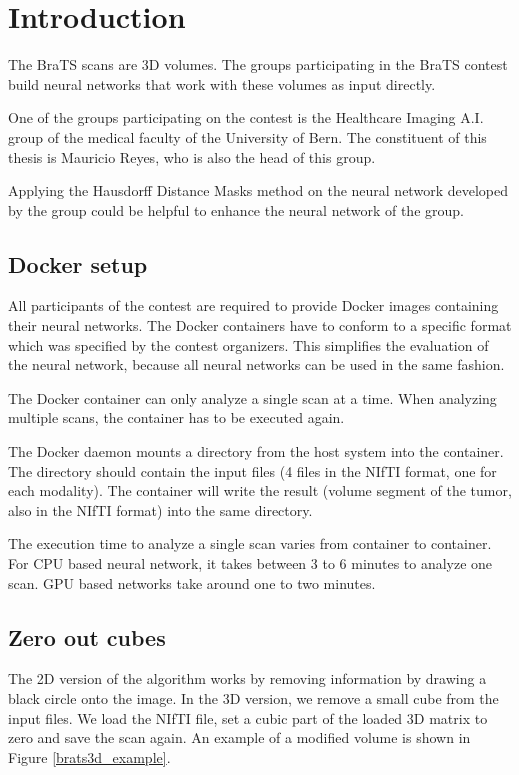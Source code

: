 \section{Introduction}
The BraTS scans are 3D volumes. The groups participating in the BraTS contest build neural networks that work with these volumes as input directly.

One of the groups participating on the contest is the Healthcare Imaging A.I. group of the medical faculty of the University of Bern. The constituent of this thesis
is Mauricio Reyes, who is also the head of this group.

Applying the Hausdorff Distance Masks method on the neural network developed by the group could be helpful to enhance the neural network of the group.

\subsection{Docker setup}

All participants of the contest are required to provide Docker images containing their neural networks. The Docker containers have to conform to a specific format which
was specified by the contest organizers. This simplifies the evaluation of the neural network, because all neural networks can be used in the same fashion.

The Docker container can only analyze a single scan at a time. When analyzing multiple scans, the container has to be executed again.

The Docker daemon mounts a directory from the host system into the container. The directory should contain the input files (4 files in the NIfTI format, one for each modality). The container will write the result (volume segment of the tumor, also in the NIfTI format) into the same directory.

The execution time to analyze a single scan varies from container to container. For CPU based neural network, it takes between 3 to 6 minutes to analyze one scan. GPU based networks take around one to two minutes.

\subsection{Zero out cubes}
The 2D version of the algorithm works by removing information by drawing a black circle onto the image. In the 3D version, we remove a small cube from the input files.
We load the NIfTI file, set a cubic part of the loaded 3D matrix to zero and save the scan again. An example of a modified volume is shown in Figure \ref{brats3d_example}.

